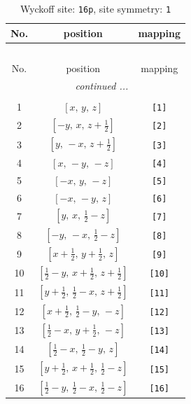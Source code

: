 \documentclass[fleqn,8pt]{jsarticle}
\begin{document}
\begin{longtable}{ccc}
\caption{Wyckoff site: {\tt 16p}, site symmetry: {\tt 1}}
 \\
 \hline \hline
No. & position & mapping \\ \hline \endfirsthead

\multicolumn{2}{l}{\tablename\ \thetable{}} \\
 \hline \hline
No. & position & mapping \\ \hline \endhead

 \hline \hline
\multicolumn{2}{r}{\footnotesize\it continued ...} \\ \endfoot

 \hline \hline
\multicolumn{2}{r}{} \\ \endlastfoot

1 & $\left[ x,\, y,\, z \right]$ & {\tt [1]} \\ \hline
2 & $\left[ - y,\, x,\, z + \frac{1}{2} \right]$ & {\tt [2]} \\ \hline
3 & $\left[ y,\, - x,\, z + \frac{1}{2} \right]$ & {\tt [3]} \\ \hline
4 & $\left[ x,\, - y,\, - z \right]$ & {\tt [4]} \\ \hline
5 & $\left[ - x,\, y,\, - z \right]$ & {\tt [5]} \\ \hline
6 & $\left[ - x,\, - y,\, z \right]$ & {\tt [6]} \\ \hline
7 & $\left[ y,\, x,\, \frac{1}{2} - z \right]$ & {\tt [7]} \\ \hline
8 & $\left[ - y,\, - x,\, \frac{1}{2} - z \right]$ & {\tt [8]} \\ \hline
9 & $\left[ x + \frac{1}{2},\, y + \frac{1}{2},\, z \right]$ & {\tt [9]} \\ \hline
10 & $\left[ \frac{1}{2} - y,\, x + \frac{1}{2},\, z + \frac{1}{2} \right]$ & {\tt [10]} \\ \hline
11 & $\left[ y + \frac{1}{2},\, \frac{1}{2} - x,\, z + \frac{1}{2} \right]$ & {\tt [11]} \\ \hline
12 & $\left[ x + \frac{1}{2},\, \frac{1}{2} - y,\, - z \right]$ & {\tt [12]} \\ \hline
13 & $\left[ \frac{1}{2} - x,\, y + \frac{1}{2},\, - z \right]$ & {\tt [13]} \\ \hline
14 & $\left[ \frac{1}{2} - x,\, \frac{1}{2} - y,\, z \right]$ & {\tt [14]} \\ \hline
15 & $\left[ y + \frac{1}{2},\, x + \frac{1}{2},\, \frac{1}{2} - z \right]$ & {\tt [15]} \\ \hline
16 & $\left[ \frac{1}{2} - y,\, \frac{1}{2} - x,\, \frac{1}{2} - z \right]$ & {\tt [16]} \\
\end{longtable}
\end{document}
